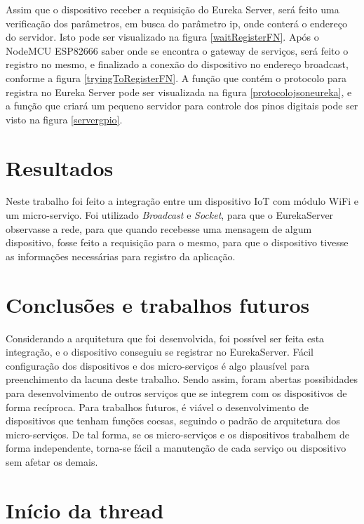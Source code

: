 \documentclass[journal]{IEEEtran}
\begin{document}
Assim que o dispositivo receber a requisição do Eureka Server, será feito uma verificação dos parâmetros, em busca do parâmetro ip, onde conterá o endereço do servidor. Isto pode ser visualizado na figura \ref{waitRegisterFN}. Após o NodeMCU ESP82666 saber onde se encontra o gateway de serviços, será feito o registro no mesmo, e finalizado a conexão do dispositivo no endereço broadcast, conforme a figura \ref{tryingToRegisterFN}. A função que contém o protocolo para registra no Eureka Server pode ser visualizada na figura \ref{protocolojsoneureka}, e a função que criará um pequeno servidor para controle dos pinos digitais pode ser visto na figura \ref{servergpio}.

\section{Resultados}
Neste trabalho foi feito a integração entre um dispositivo IoT com módulo WiFi e um micro-serviço. Foi utilizado  \emph{Broadcast} e \emph{Socket}, para que o EurekaServer observasse a rede, para que quando recebesse uma mensagem de algum dispositivo, fosse feito a requisição para o mesmo, para que o dispositivo tivesse as informações necessárias para registro da aplicação.   

\section{Conclusões e trabalhos futuros}
Considerando a arquitetura que foi desenvolvida, foi possível ser feita esta integração, e o dispositivo conseguiu se registrar no EurekaServer. Fácil configuração dos dispositivos e dos micro-serviços é algo plausível para preenchimento da lacuna deste trabalho. Sendo assim, foram abertas possibidades para desenvolvimento de outros serviços que se integrem com os dispositivos de forma recíproca. Para trabalhos futuros, é viável o desenvolvimento de dispositivos que tenham funções coesas, seguindo o padrão de arquitetura dos micro-serviços. De tal forma, se os micro-serviços e os dispositivos trabalhem de forma independente, torna-se fácil a manutenção de cada serviço ou dispositivo sem afetar os demais.

\newpage
\appendices

\section{Início da thread}
\end{document}
